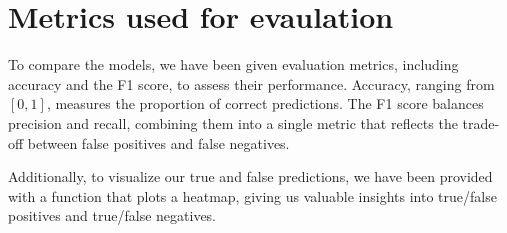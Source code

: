 \section{Metrics used for evaulation}
To compare the models, we have been given evaluation metrics, including accuracy and the F1 score, to assess their performance. 
Accuracy, ranging from $[0, 1]$, measures the proportion of correct predictions.
The F1 score balances precision and recall, combining them into a single metric that reflects the trade-off between false positives and false negatives.
\par 
Additionally, to visualize our true and false predictions, we have been provided with a function that plots a heatmap, giving us valuable insights into true/false positives and true/false negatives.
